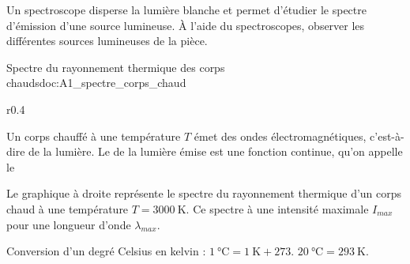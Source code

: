 
\mesure
Un spectroscope disperse la lumière blanche et permet d'étudier le spectre d'émission d'une source lumineuse.
À l'aide du spectroscopes, observer les différentes sources lumineuses de la pièce.


\newpage
\vspace*{-32pt}
\begin{doc}{Spectre du rayonnement thermique des corps chauds}{doc:A1_spectre_corps_chaud}
  \begin{wrapfigure}[5]{r}{0.4\linewidth}
    \vspace*{-22pt}
    \centering
  \end{wrapfigure}
  \phantom{b}\vspace*{-22pt}
  
  \begin{encart}  
    Un corps chauffé à une température $T$ émet des ondes électromagnétiques, c'est-à-dire de la lumière.
    Le  de la lumière émise est une fonction continue, qu'on appelle le 
  \end{encart}

  Le graphique à droite représente le spectre du rayonnement thermique d'un corps chaud à une température $T = \qty{3000}{\kelvin}$.
  Ce spectre à une intensité maximale $I_{max}$ pour une longueur d'onde $\lambda_{max}$.
  \smallskip

  \begin{encart}
    Conversion d'un degré Celsius en kelvin :
    $\qty{1}{\degreeCelsius} = \qty{1}{\kelvin} + 273$. 
    \exemple $\qty{20}{\degreeCelsius} = \qty{293}{\kelvin}$.
  \end{encart}
\end{doc}



